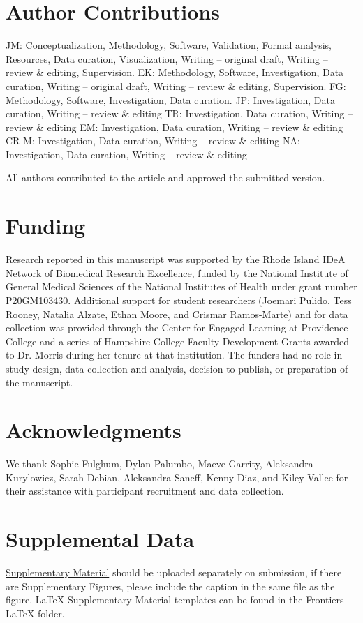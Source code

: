 \documentclass[utf8]{FrontiersinHarvard} %
\begin{document}
	\section*{Author Contributions}
	JM: Conceptualization, Methodology, Software, Validation, Formal analysis, Resources, Data curation, Visualization, Writing – original draft, Writing – review \& editing, Supervision.
	EK: Methodology, Software, Investigation, Data curation, Writing – original draft, Writing – review \& editing, Supervision.
	FG: Methodology, Software, Investigation, Data curation.
	JP: Investigation, Data curation, Writing – review \& editing
	TR: Investigation, Data curation, Writing – review \& editing
	EM: Investigation, Data curation, Writing – review \& editing
	CR-M: Investigation, Data curation, Writing – review \& editing
	NA: Investigation, Data curation, Writing – review \& editing
	
	All authors contributed to the article and approved the submitted version.
	
	\section*{Funding}
	Research reported in this manuscript was supported by the Rhode Island IDeA Network of Biomedical Research Excellence, funded by the National Institute of General Medical Sciences of the National Institutes of Health under grant number P20GM103430. Additional support for student researchers (Joemari Pulido, Tess Rooney, Natalia Alzate, Ethan Moore, and Crismar Ramos-Marte) and for data collection was provided through the Center for Engaged Learning at Providence College and a series of Hampshire College Faculty Development Grants awarded to Dr. Morris during her tenure at that institution. The funders had no role in study design, data collection and analysis, decision to publish, or preparation of the manuscript.
	
	
	\section*{Acknowledgments}
	We thank Sophie Fulghum, Dylan Palumbo, Maeve Garrity, Aleksandra Kurylowicz, Sarah Debian, Aleksandra Saneff, Kenny Diaz, and Kiley Vallee for their assistance with participant recruitment and data collection.
	
	\section*{Supplemental Data}
	\href{http://home.frontiersin.org/about/author-guidelines#SupplementaryMaterial}{Supplementary Material} should be uploaded separately on submission, if there are Supplementary Figures, please include the caption in the same file as the figure. LaTeX Supplementary Material templates can be found in the Frontiers LaTeX folder.
	
\end{document}
